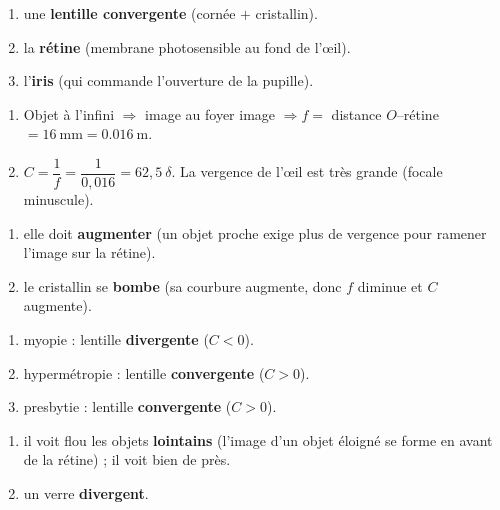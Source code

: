 \documentclass[11pt,a4paper]{article}
\begin{document}

\begin{corrige}
\begin{enumerate}[label=\alph*)]
  \item une \textbf{lentille convergente} (cornée $+$ cristallin).
  \item la \textbf{rétine} (membrane photosensible au fond de l'\oe il).
  \item l'\textbf{iris} (qui commande l'ouverture de la pupille).
\end{enumerate}
\end{corrige}

\begin{corrige}
\begin{enumerate}[label=\alph*)]
  \item Objet à l'infini $\Rightarrow$ image au foyer image $\Rightarrow f=$ distance $O$--rétine
        $=\qty{16}{\mm}=\qty{0.016}{\m}$.
  \item $C=\dfrac{1}{f}=\dfrac{1}{0,016}=62{,}5~\delta$. La vergence de l'\oe il est très
        grande (focale minuscule).
\end{enumerate}
\end{corrige}

\begin{corrige}
\begin{enumerate}[label=\alph*)]
  \item elle doit \textbf{augmenter} (un objet proche exige plus de vergence pour ramener l'image sur
        la rétine).
  \item le cristallin se \textbf{bombe} (sa courbure augmente, donc $f$ diminue et $C$ augmente).
\end{enumerate}
\end{corrige}

\begin{corrige}
\begin{enumerate}[label=\alph*)]
  \item myopie : lentille \textbf{divergente} ($C<0$).
  \item hypermétropie : lentille \textbf{convergente} ($C>0$).
  \item presbytie : lentille \textbf{convergente} ($C>0$).
\end{enumerate}
\end{corrige}

\begin{corrige}[le myope]
\begin{enumerate}[label=\alph*)]
  \item il voit flou les objets \textbf{lointains} (l'image d'un objet éloigné se forme en avant de la
        rétine) ; il voit bien de près.
  \item un verre \textbf{divergent}.
\end{enumerate}
\end{corrige}
\end{document}
